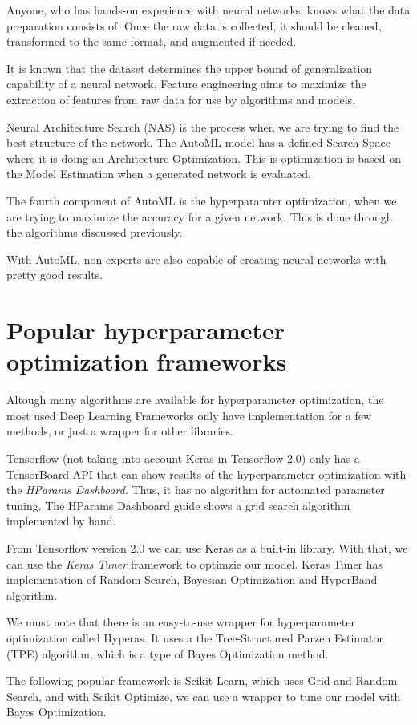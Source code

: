 \documentclass[conference]{IEEEtran}
\begin{document}
Anyone, who has hands-on experience with neural networks, knows what the data preparation consists of. Once the raw data is collected, it should be cleaned, transformed to the same format, and augmented if needed. 

It is known that the dataset determines the upper bound of generalization capability of a neural network. Feature engineering aims to maximize the extraction of features from raw data for use by algorithms and
models. \cite{he2020automl}

Neural Architecture Search (NAS) is the process when we are trying to find the best structure of the network. The AutoML model has a defined Search Space where it is doing an Architecture Optimization. This is optimization is based on the Model Estimation when a generated network is evaluated.

The fourth component of AutoML is the hyperparamter optimization, when we are trying to maximize the accuracy for a given network. This is done through the algorithms discussed previously.

With AutoML, non-experts are also capable of creating neural networks with pretty good results.

\section{Popular hyperparameter optimization frameworks}
Altough many algorithms are available for hyperparameter optimization, the most used Deep Learning Frameworks only have implementation for a few methods, or just a wrapper for other libraries.

Tensorflow (not taking into account Keras in Tensorflow 2.0) only has a TensorBoard API that can show results of the hyperparameter optimization with the \emph{HParams Dashboard}. Thus, it has no algorithm for automated parameter tuning. The HParams Dashboard guide \cite{tensorboard} shows a grid search algorithm implemented by hand.

From Tensorflow version 2.0 we can use Keras as a built-in library. With that, we can use the \emph{Keras Tuner} framework to optimzie our model. Keras Tuner has implementation of Random Search, Bayesian Optimization and HyperBand algorithm.

We must note that there is an easy-to-use wrapper for hyperparameter optimization called Hyperas. It uses a the Tree-Structured Parzen Estimator (TPE) algorithm, which is a type of Bayes Optimization method.

The following popular framework is Scikit Learn, which uses Grid and Random Search, and with Scikit Optimize, we can use a wrapper to tune our model with Bayes Optimization.
\end{document}
